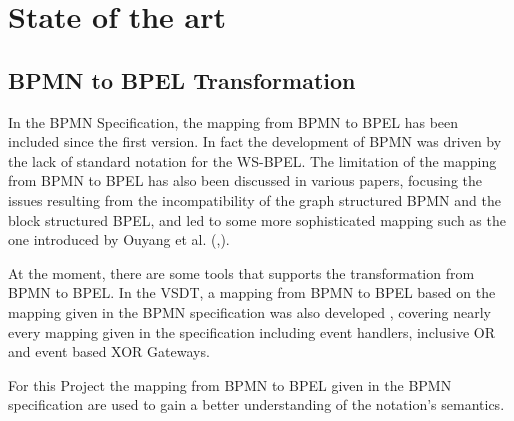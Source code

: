 \chapter{State of the art}
\label{chap:sota}
\section{BPMN to BPEL Transformation}
In the BPMN Specification, the mapping from BPMN to BPEL has been included since the first version. In fact the development of BPMN was driven by the lack of standard notation for the WS-BPEL\cite{weidlich2008}. The limitation of the mapping from BPMN to BPEL has also been discussed in various papers, focusing the issues resulting from the incompatibility of the graph structured BPMN and the block structured BPEL, and led to some more sophisticated mapping such as the one introduced by Ouyang et al. (\cite{Ouyang2006a},\cite{Ouyang2006b}).

At the moment, there are some tools that supports the transformation from BPMN to BPEL. 
In the VSDT, a mapping from BPMN to BPEL based on the mapping given in the BPMN specification was also developed \cite{TK07}, covering nearly every mapping given in the specification including event handlers, inclusive OR and event based XOR Gateways. 

For this Project the mapping from BPMN to BPEL given in the BPMN specification are used to gain a better understanding of the notation's semantics.


